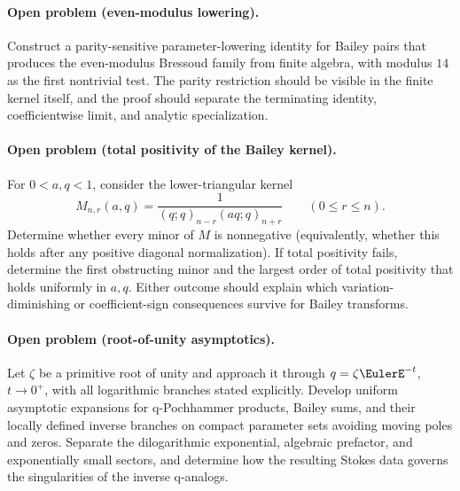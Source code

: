 \paragraph{Open problem (even-modulus lowering).}
\label{qg:prob-even-modulus-lowering}
Construct a parity-sensitive parameter-lowering identity for Bailey pairs
that produces the even-modulus Bressoud family from finite algebra, with
modulus \(14\) as the first nontrivial test.  The parity restriction should be
visible in the finite kernel itself, and the proof should separate the
terminating identity, coefficientwise limit, and analytic specialization.

\paragraph{Open problem (total positivity of the Bailey kernel).}
\label{qg:prob-bailey-kernel-total-positivity}
For \(0<a,q<1\), consider the lower-triangular kernel
\[
 M_{n,r}(a,q)
 =\frac{1}{(q;q)_{n-r}(aq;q)_{n+r}}
 \qquad(0\le r\le n).
\]
Determine whether every minor of \(M\) is nonnegative (equivalently, whether
this holds after any positive diagonal normalization).  If total positivity
fails, determine the first obstructing minor and the largest order of total
positivity that holds uniformly in \(a,q\).  Either outcome should explain
which variation-diminishing or coefficient-sign consequences survive for
Bailey transforms.

\paragraph{Open problem (root-of-unity asymptotics).}
\label{qg:prob-root-of-unity-asymptotics}
Let \(\zeta\) be a primitive root of unity and approach it through
\(q=\zeta\EulerE^{-t}\), \(t\to0^+\), with all logarithmic branches stated
explicitly.  Develop uniform asymptotic expansions for q-Pochhammer products,
Bailey sums, and their locally defined inverse branches on compact parameter
sets avoiding moving poles and zeros.  Separate the dilogarithmic exponential,
algebraic prefactor, and exponentially small sectors, and determine how the
resulting Stokes data governs the singularities of the inverse q-analogs.
